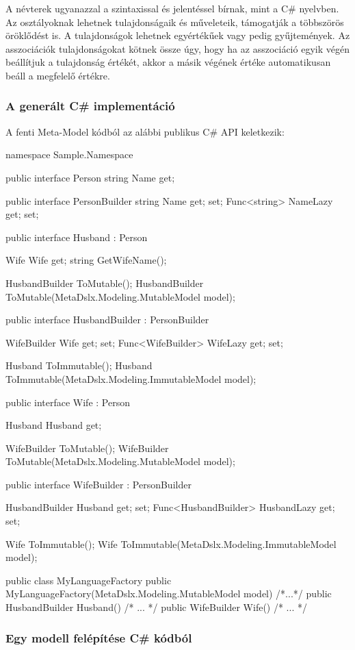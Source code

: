 \documentclass[12pt, a4paper]{report}
\begin{document}
A névterek ugyanazzal a szintaxissal és jelentéssel bírnak, mint a C\# nyelvben. Az osztályoknak lehetnek tulajdonságaik és műveleteik, támogatják a többszörös öröklődést is. A tulajdonságok lehetnek egyértékűek vagy pedig gyűjtemények. Az asszociációk tulajdonságokat kötnek össze úgy, hogy ha az asszociáció egyik végén beállítjuk a tulajdonság értékét, akkor a másik végének értéke automatikusan beáll a megfelelő értékre.

\subsubsection{A generált C\# implementáció}

A fenti Meta-Model kódból az alábbi publikus C\# API keletkezik:

\begin{csharpcode}
namespace Sample.Namespace
{
	public interface Person
	{
		string Name { get; }
	}
	
	public interface PersonBuilder
	{
		string Name { get; set; }
		Func<string> NameLazy { get; set; }
	}
	
	
	public interface Husband : Person
	{
		Wife Wife { get; }
		string GetWifeName();
		
		HusbandBuilder ToMutable();
		HusbandBuilder ToMutable(MetaDslx.Modeling.MutableModel model);
	}
	
	public interface HusbandBuilder : PersonBuilder
	{
		WifeBuilder Wife { get; set; }
		Func<WifeBuilder> WifeLazy { get; set; }
		
		Husband ToImmutable();
		Husband ToImmutable(MetaDslx.Modeling.ImmutableModel model);
	}
	
	
	public interface Wife : Person
	{
		Husband Husband { get; }
		
		WifeBuilder ToMutable();
		WifeBuilder ToMutable(MetaDslx.Modeling.MutableModel model);
	}
	
	public interface WifeBuilder : PersonBuilder
	{
		HusbandBuilder Husband { get; set; }
		Func<HusbandBuilder> HusbandLazy { get; set; }
		
		Wife ToImmutable();
		Wife ToImmutable(MetaDslx.Modeling.ImmutableModel model);
	}
	
	
	public class MyLanguageFactory
	{
		public MyLanguageFactory(MetaDslx.Modeling.MutableModel model) {/*...*/}
		public HusbandBuilder Husband() { /* ... */ }
		public WifeBuilder Wife() { /* ... */ }
	}
}
\end{csharpcode}


\subsubsection{Egy modell felépítése C\# kódból}
\end{document}
